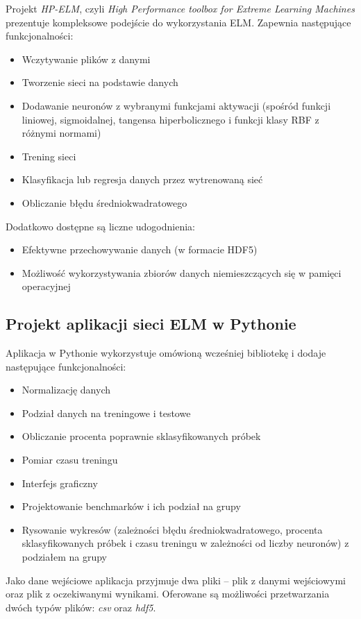 \documentclass{article}
\begin{document}
Projekt \textit{HP-ELM}, czyli \textit{High Performance toolbox for Extreme Learning Machines} prezentuje kompleksowe podejście do wykorzystania ELM. Zapewnia następujące funkcjonalności:
\begin{itemize}
\item Wczytywanie plików z danymi
\item Tworzenie sieci na podstawie danych
\item Dodawanie neuronów z wybranymi funkcjami aktywacji (spośród funkcji liniowej, sigmoidalnej, tangensa hiperbolicznego i funkcji klasy RBF z różnymi normami)
\item Trening sieci
\item Klasyfikacja lub regresja danych przez wytrenowaną sieć
\item Obliczanie błędu średniokwadratowego
\end{itemize}
Dodatkowo dostępne są liczne udogodnienia:
\begin{itemize}
\item Efektywne przechowywanie danych (w formacie HDF5)
\item Możliwość wykorzystywania zbiorów danych niemieszczących się w pamięci operacyjnej
\end{itemize}
\subsection{Projekt aplikacji sieci ELM w Pythonie}
Aplikacja w Pythonie wykorzystuje omówioną wcześniej bibliotekę i dodaje następujące funkcjonalności:
\begin{itemize}
\item Normalizację danych
\item Podział danych na treningowe i testowe
\item Obliczanie procenta poprawnie sklasyfikowanych próbek
\item Pomiar czasu treningu
\item Interfejs graficzny
\item Projektowanie benchmarków i ich podział na grupy
\item Rysowanie wykresów (zależności błędu średniokwadratowego, procenta sklasyfikowanych próbek i czasu treningu w zależności od liczby neuronów) z podziałem na grupy 
\end{itemize}
Jako dane wejściowe aplikacja przyjmuje dwa pliki -- plik z danymi wejściowymi oraz plik z oczekiwanymi wynikami. Oferowane są możliwości przetwarzania dwóch typów plików: \textit{csv} oraz \textit{hdf5}. 
\end{document}
